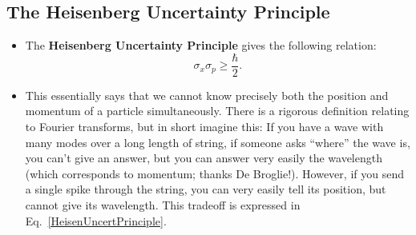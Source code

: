 \subsection{The Heisenberg Uncertainty Principle}
\begin{itemize}
    \item The \textbf{Heisenberg Uncertainty Principle} gives the following relation:
        \begin{equation}
            \boxed{\sigma_x \sigma_p \geq \frac{\hbar}{2}.}\label{HeisenUncertPrinciple}
        \end{equation}
    \item This essentially says that we cannot know precisely both the position and momentum of a particle simultaneously. There is a rigorous definition relating to Fourier transforms, but in short imagine this: If you have a wave with many modes over a long length of string, if someone asks ``where'' the wave is, you can't give an answer, but you can answer very easily the wavelength (which corresponds to momentum; thanks De Broglie!). However, if you send a single spike through the string, you can very easily tell its position, but cannot give its wavelength. This tradeoff is expressed in Eq.~\eqref{HeisenUncertPrinciple}.
\end{itemize}


